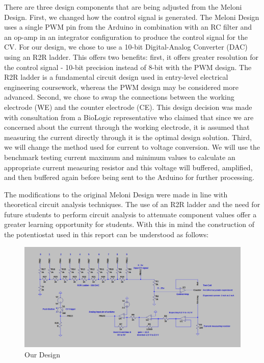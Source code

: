 \documentclass{article}
\begin{document}
There are three design components that are being adjusted from the Meloni Design. First, we changed how the control signal is generated. The Meloni Design uses a single PWM pin from the Arduino in combination with an RC filter and an op-amp in an integrator configuration to produce the control signal for the CV. For our design, we chose to use a 10-bit Digital-Analog Converter (DAC) using an R2R ladder. This offers two benefits: first, it offers greater resolution for the control signal - 10-bit precision instead of 8-bit with the PWM design. The R2R ladder is a fundamental circuit design used in entry-level electrical engineering coursework, whereas the PWM design may be considered more advanced. Second, we chose to swap the connections between the working electrode (WE) and the counter electrode (CE). This design decision was made with consultation from a BioLogic representative who claimed that since we are concerned about the current through the working electrode, it is assumed that measuring the current directly through it is the optimal design solution. Third, we will change the method used for current to voltage conversion. We will use the benchmark testing current maximum and minimum values to calculate an appropriate current measuring resistor and this voltage will buffered, amplified, and then buffered again before being sent to the Arduino for further processing.

The modifications to the original Meloni Design were made in line with theoretical circuit analysis techniques. The use of an R2R ladder and the need for future students to perform circuit analysis to attenuate component values offer a greater learning opportunity for students. With this in mind the construction of the potentiostat used in this report can be understood as follows:

\begin{figure}[H]
    \centering
    \includegraphics[width=.9\linewidth]{pot_design.png}
    \caption{Our Design}
\end{figure}
\end{document}
